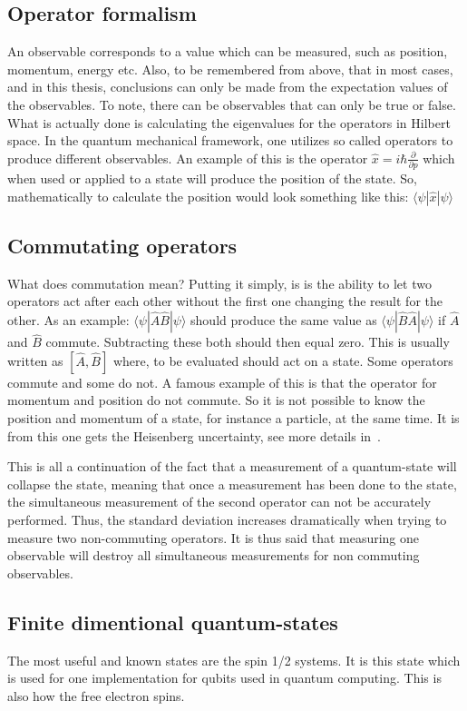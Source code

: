 \subsection{Operator formalism}\label{sec:intro:Background of quantum mechanics:Operator formalism}
An observable corresponds to a value which can be measured, such as position, momentum, energy etc. Also, to be remembered from above, that in most cases, and in this thesis, conclusions can only be made from the expectation values of the observables. To note, there can be observables that can only be true or false. What is actually done is calculating the eigenvalues for the operators in Hilbert space. In the quantum mechanical framework, one utilizes so called operators to produce different observables. An example of this is the operator $\hat{x} = i\hbar\frac{\partial}{\partial p}$   
which when used or applied to a state will produce the position of the state.  So, mathematically to calculate the position would look something like this: $\langle\psi|\hat{x}|\psi\rangle$ 
\subsection{Commutating operators}
What does commutation mean?
Putting it simply, is is the ability to let two operators act after each other without the first one changing the result for the other. As an example: $\langle\psi|\hat{A}\hat{B}|\psi\rangle$ should produce the same value as $\langle\psi|\hat{B}\hat{A}|\psi\rangle$ if $\hat{A}$ and $\hat{B}$ commute. Subtracting these both should then equal zero. This is usually written as $[\hat{A},\hat{B}]$ where, to be evaluated should act on a state.
Some operators commute and some do not. A famous example of this is that the operator for momentum and position do not commute. So it is not possible to know the position and momentum of a state, for instance a particle, at the same time. It is from this one gets the Heisenberg uncertainty, see more details in~\cite{Bransden:2000}.

This is all a continuation of the fact that a measurement of a quantum-state will collapse the state, meaning that once a measurement has been done to the state, the simultaneous measurement of the second operator can not be accurately performed. Thus, the standard deviation increases dramatically when trying to measure two non-commuting operators. It is thus said that measuring one observable will destroy all simultaneous measurements for non commuting observables.
\subsection{Finite dimentional quantum-states}\label{sec:intro:Background of quantum mechanics:Finite dimentional quantum-states}
The most useful and known states are the spin 1/2 systems. It is this state which is used for one implementation for qubits used in quantum computing. This is also how the free electron spins. 

